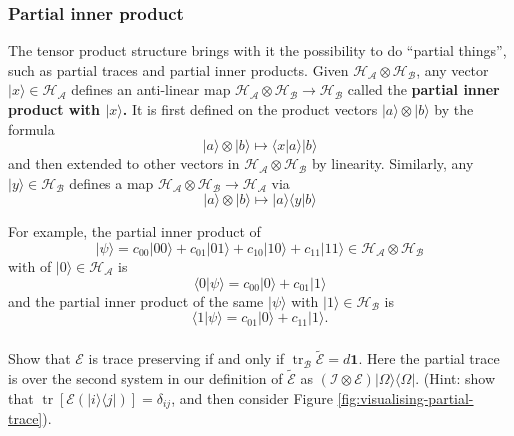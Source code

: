 \documentclass[fleqn]{article}
\begin{document}
\hypertarget{partial-inner-product}{%
\subsubsection{Partial inner product}\label{partial-inner-product}}

The tensor product structure brings with it the possibility to do ``partial things'', such as partial traces and partial inner products.
Given \(\mathcal{H}_{\mathcal{A}}\otimes\mathcal{H}_{\mathcal{B}}\), any vector \(|x\rangle\in\mathcal{H}_{\mathcal{A}}\) defines an anti-linear map \(\mathcal{H}_{\mathcal{A}}\otimes\mathcal{H}_{\mathcal{B}}\to\mathcal{H}_{\mathcal{B}}\) called the \textbf{partial inner product with \(|x\rangle\).}
It is first defined on the product vectors \(|a\rangle\otimes|b\rangle\) by the formula
\[
  |a\rangle\otimes|b\rangle
  \longmapsto \langle x|a\rangle|b\rangle
\]
and then extended to other vectors in \(\mathcal{H}_{\mathcal{A}}\otimes\mathcal{H}_{\mathcal{B}}\) by linearity.
Similarly, any \(|y\rangle\in\mathcal{H}_{\mathcal{B}}\) defines a map \(\mathcal{H}_{\mathcal{A}}\otimes\mathcal{H}_{\mathcal{B}}\to\mathcal{H}_{\mathcal{A}}\) via
\[
  |a\rangle\otimes|b\rangle
  \longmapsto |a\rangle\langle y|b\rangle
\]

For example, the partial inner product of
\[
  |\psi\rangle=c_{00}|00\rangle+c_{01}|01\rangle+c_{10}|10\rangle+c_{11}|11\rangle\in\mathcal{H}_{\mathcal{A}}\otimes\mathcal{H}_{\mathcal{B}}
\]
with of \(|0\rangle\in\mathcal{H}_{\mathcal{A}}\) is
\[
  \langle 0|\psi\rangle = c_{00}|0\rangle + c_{01}|1\rangle
\]
and the partial inner product of the same \(|\psi\rangle\) with \(|1\rangle\in\mathcal{H}_{\mathcal{B}}\) is
\[
  \langle 1|\psi\rangle = c_{01}|0\rangle + c_{11}|1\rangle.
\]

\hypertarget{section-15}{%
\subsubsection{}\label{section-15}}

Show that \(\mathcal{E}\) is trace preserving if and only if \(\operatorname{tr}_{\mathcal{B}}\widetilde{\mathcal{E}}=d\mathbf{1}\).
Here the partial trace is over the second system in our definition of \(\widetilde{\mathcal{E}}\) as \((\mathcal{I}\otimes\mathcal{E})|\Omega\rangle\langle\Omega|\).
(Hint: show that \(\operatorname{tr}[\mathcal{E}(|i\rangle\langle j|)]=\delta_{ij}\), and then consider Figure \ref{fig:visualising-partial-trace}).

\hypertarget{section-16}{%
\subsubsection{}\label{section-16}}
\end{document}
